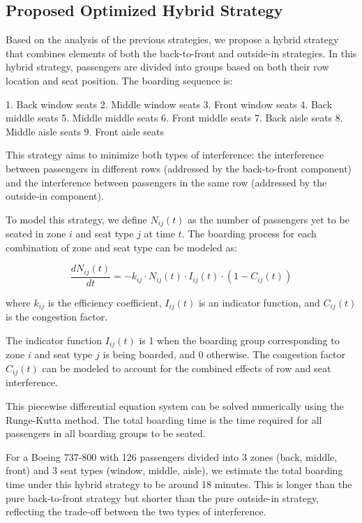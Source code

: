 \documentclass[12pt,a4paper]{article}
\begin{document}
\subsection{Proposed Optimized Hybrid Strategy}

Based on the analysis of the previous strategies, we propose a hybrid strategy that combines elements of both the back-to-front and outside-in strategies. In this hybrid strategy, passengers are divided into groups based on both their row location and seat position. The boarding sequence is:

1. Back window seats
2. Middle window seats
3. Front window seats
4. Back middle seats
5. Middle middle seats
6. Front middle seats
7. Back aisle seats
8. Middle aisle seats
9. Front aisle seats

This strategy aims to minimize both types of interference: the interference between passengers in different rows (addressed by the back-to-front component) and the interference between passengers in the same row (addressed by the outside-in component).

To model this strategy, we define $N_{ij}(t)$ as the number of passengers yet to be seated in zone $i$ and seat type $j$ at time $t$. The boarding process for each combination of zone and seat type can be modeled as:

\begin{equation}
\frac{dN_{ij}(t)}{dt} = -k_{ij} \cdot N_{ij}(t) \cdot I_{ij}(t) \cdot (1 - C_{ij}(t))
\label{eq:hybrid_boarding}
\end{equation}

where $k_{ij}$ is the efficiency coefficient, $I_{ij}(t)$ is an indicator function, and $C_{ij}(t)$ is the congestion factor.

The indicator function $I_{ij}(t)$ is 1 when the boarding group corresponding to zone $i$ and seat type $j$ is being boarded, and 0 otherwise. The congestion factor $C_{ij}(t)$ can be modeled to account for the combined effects of row and seat interference.

This piecewise differential equation system can be solved numerically using the Runge-Kutta method. The total boarding time is the time required for all passengers in all boarding groups to be seated.

For a Boeing 737-800 with 126 passengers divided into 3 zones (back, middle, front) and 3 seat types (window, middle, aisle), we estimate the total boarding time under this hybrid strategy to be around 18 minutes. This is longer than the pure back-to-front strategy but shorter than the pure outside-in strategy, reflecting the trade-off between the two types of interference.
\end{document}
